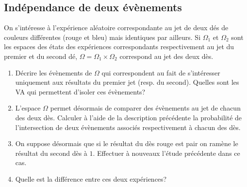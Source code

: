 \documentclass[11pt, a4paper]{article}
\begin{document}
\subsection{Indépendance de deux évènements}
\label{sec:independance}

\begin{question}
  On s'intéresse à l'expérience aléatoire correspondante au jet de
  deux dés de couleurs différentes (rouge et bleu) mais identiques par
  ailleurs. Si $\Omega_1$ et $\Omega_2$ sont les espaces des états des
  expériences correspondants respectivement au jet du premier et du
  second dé, $\Omega = \Omega_1\times \Omega_2$ correspond au jet des
  deux dès.
  \begin{enumerate}
  \item Décrire les évènements de $\Omega$ qui correspondent au fait
    de s'intéresser uniquement aux résultats du premier jet (resp. du
    second). Quelles sont les VA qui permettent d'isoler ces
    évènements?
  \item L'espace $\Omega$ permet désormais de comparer des évènements
    au jet de chacun des deux dès. Calculer à l'aide de la description
    précédente la probabilité de l'intersection de deux évènements
    associés respectivement à chacun des dès.
  \item On suppose désormais que si le résultat du dès rouge est pair
    on ramène le résultat du second dès à $1$. Effectuer à nouveaux
    l'étude précédente dans ce cas.
  \item Quelle est la différence entre ces deux expériences?
  \end{enumerate}
\end{question}
\end{document}
